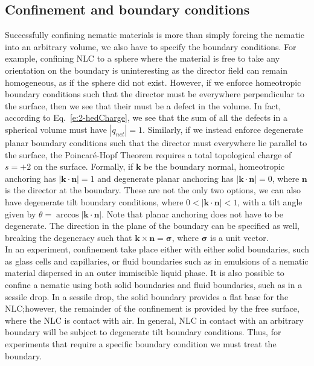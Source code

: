 \subsection{Confinement and boundary conditions}
Successfully confining nematic materials is more than simply forcing the nematic into an arbitrary volume, we also have to specify the boundary conditions.
For example, confining NLC to a sphere where the material is free to take any orientation on the boundary is uninteresting as the director field can remain homogeneous, as if the sphere did not exist.
However, if we enforce homeotropic boundary conditions such that the director must be everywhere perpendicular to the surface, then we see that their must be a defect in the volume.
In fact, according to Eq.~\ref{e:2-hedCharge}, we see that the sum of all the defects in a spherical volume must have $|q_{net}| = 1$.
Similarly, if we instead enforce degenerate planar boundary conditions such that the director must everywhere lie parallel to the surface, the Poincar\'e-Hopf Theorem requires a total topological charge of $s = +2$ on the surface.
Formally, if $\mathbf{k}$ be the boundary normal, homeotropic anchoring has $|\mathbf{k} \cdot \mathbf{n}| = 1$ and degenerate planar anchoring has $|\mathbf{k} \cdot \mathbf{n}| = 0$, where $\mathbf{n}$ is the director at the boundary.
These are not the only two options, we can also have degenerate tilt boundary conditions, where $0< |\mathbf{k} \cdot \mathbf{n}| < 1$, with a tilt angle given by $\theta = \arccos |\mathbf{k} \cdot \mathbf{n}| $.
Note that planar anchoring does not have to be degenerate.
The direction in the plane of the boundary can be specified as well, breaking the degeneracy such that $\mathbf{k} \times \mathbf{n} = \bm{\sigma}$, where $\bm{\sigma}$ is a unit vector.\\

In an experiment, confinement take place either with either solid boundaries, such as glass cells and capillaries, or fluid boundaries such as in emulsions of a nematic material dispersed in an outer immiscible liquid phase.
It is also possible to confine a nematic using both solid boundaries and fluid boundaries, such as in a sessile drop.
In a sessile drop, the solid boundary provides a flat base for the NLC;\@ however, the remainder of the confinement is provided by the free surface, where the NLC is contact with air.
In general, NLC in contact with an arbitrary boundary will be subject to degenerate tilt boundary conditions.
Thus, for experiments that require a specific boundary condition we must treat the boundary.\\

